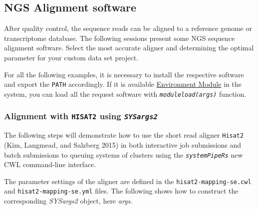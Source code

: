 \documentclass[14pt,]{article}
\begin{document}
\hypertarget{ngs-alignment-software}{%
\subsection{NGS Alignment software}\label{ngs-alignment-software}}

After quality control, the sequence reads can be aligned to a reference genome or
transcriptome database. The following sessions present some NGS sequence alignment
software. Select the most accurate aligner and determining the optimal parameter
for your custom data set project.

For all the following examples, it is necessary to install the respective software
and export the \texttt{PATH} accordingly. If it is available \href{http://modules.sourceforge.net/}{Environment Module}
in the system, you can load all the request software with \emph{\texttt{moduleload(args)}} function.

\hypertarget{alignment-with-hisat2-using-sysargs2}{%
\subsubsection{\texorpdfstring{Alignment with \texttt{HISAT2} using \emph{\texttt{SYSargs2}}}{Alignment with HISAT2 using SYSargs2}}\label{alignment-with-hisat2-using-sysargs2}}

The following steps will demonstrate how to use the short read aligner \texttt{Hisat2}
(Kim, Langmead, and Salzberg 2015) in both interactive job submissions and batch submissions to
queuing systems of clusters using the \emph{\texttt{systemPipeR\textquotesingle{}s}} new CWL command-line interface.

The parameter settings of the aligner are defined in the \texttt{hisat2-mapping-se.cwl}
and \texttt{hisat2-mapping-se.yml} files. The following shows how to construct the
corresponding \emph{SYSargs2} object, here \emph{args}.
\end{document}

